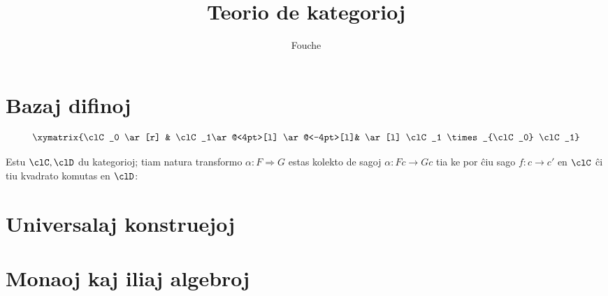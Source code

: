 \documentclass{book}
\author{Fouche}
\title{Teorio de kategorioj}
\begin{document}
\maketitle

\chapter{Bazaj difinoj}
\begin{definition}[Kategorio]
  \[\xymatrix{\clC_0 \ar[r] & \clC_1\ar@<4pt>[l] \ar@<-4pt>[l]& \ar[l] \clC_1 \times_{\clC_0} \clC_1}\]
\end{definition}
\begin{definition}[Functo]
  
\end{definition}
\begin{definition}
  Estu $\clC,\clD$ du kategorioj; tiam natura transformo $\alpha : F \Rightarrow G$ estas kolekto de sagoj $\alpha : Fc \to Gc$ tia ke por ĉiu sago $f : c \to c'$ en $\clC$ ĉi tiu kvadrato komutas en $\clD$:
\end{definition}
\chapter{Universalaj konstruejoj}
\chapter{Monaoj kaj iliaj algebroj}
\end{document}
